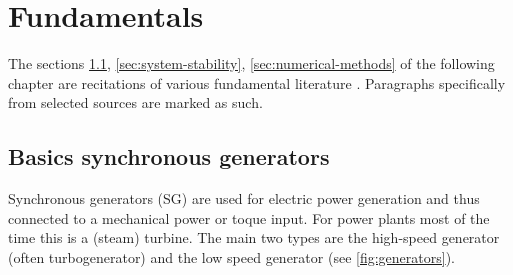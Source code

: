 
\chapter{Fundamentals}
\label{chap:fundamentals}

The sections \ref{sec:basics-sg}, \ref{sec:system-stability}, \ref{sec:numerical-methods} of the following chapter are recitations of various fundamental literature \autocite{oedingElektrischeKraftwerkeUnd2016,schwabElektroenergiesystemeSmarteStromversorgung2022,georgievNumericalAnalysisTime2022,milesNumericalMethodsPython2023,langtangenPrimerScientificProgramming2016,machowskiPowerSystemDynamics2020,kundurPowerSystemStability2022}. Paragraphs specifically from selected sources are marked as such. 


\section{Basics synchronous generators}
\label{sec:basics-sg}

Synchronous generators (\acs{SG}) are used for electric power generation and thus connected to a mechanical power or toque input. For power plants most of the time this is a (steam) turbine. The main two types are the high-speed generator (often turbogenerator) and the low speed generator (see \autoref{fig:generators}). \autocite{machowskiPowerSystemDynamics2020,oedingElektrischeKraftwerkeUnd2016}

